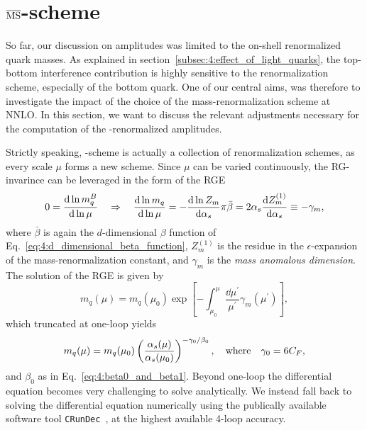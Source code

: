 \section{\texorpdfstring{$\overline{\mathrm{MS}}$}{MS}-scheme}
So far, our discussion on amplitudes was limited to the on-shell renormalized quark masses. As explained in section~\ref{subsec:4:effect_of_light_quarks}, the top-bottom interference contribution is highly sensitive to the renormalization scheme, especially of the bottom quark. One of our central aims, was therefore to investigate the impact of the choice of the mass-renormalization scheme at \acs{NNLO}. In this section, we want to discuss the relevant adjustments necessary for the computation of the \MS-renormalized amplitudes.

Strictly speaking, \MS-scheme is actually a collection of renormalization schemes, as every scale $\mu$ forms a new scheme. Since $\mu$ can be varied continuously, the \acs{RG}-invarince can be leveraged in the form of the \acs{RGE}
\begin{equation}
0 = \frac{\mathrm{d} \ln m_q^B}{\mathrm{d} \ln \mu} \quad \Rightarrow \quad \frac{\mathrm{d} \ln m_q}{\mathrm{d} \ln \mu} = - \frac{\mathrm{d} \ln Z_m}{\mathrm{d} \alpha_s} \pi \bar{\beta} = 2 \alpha_s \frac{\mathrm{d} Z_m^{(1)}}{\mathrm{d} \alpha_s} \equiv - \gamma_m,
\end{equation}
where $\bar{\beta}$ is again the $d$-dimensional $\beta$ function of Eq.~\eqref{eq:4:d_dimensional_beta_function}, $Z_m^{(1)}$ is the residue in the $\epsilon$-expansion of the mass-renormalization constant, and $\gamma_m$ is the \textit{mass anomalous dimension}. The solution of the \acs{RGE} is given by
\begin{equation}
m_q (\mu) = m_q(\mu_0) \exp\!\left[- \int_{\mu_0}^\mu \frac{\dd \mu^\prime}{\mu^\prime} \gamma_m(\mu^\prime) \right],
\end{equation}
which truncated at one-loop yields
\begin{equation}
m_q(\mu) = m_q(\mu_0) \left( \frac{\alpha_s(\mu)}{\alpha_s (\mu_0)} \right)^{- \gamma_0/\beta_0}, \quad \text{where} \quad \gamma_0 = 6 C_F,
\end{equation}
and $\beta_0$ as in Eq.~\eqref{eq:4:beta0_and_beta1}. Beyond one-loop the differential equation becomes very challenging to solve analytically. We instead fall back to solving the differential equation numerically using the publically available software tool \texttt{CRunDec}~\cite{Schmidt:2012az}, at the highest available 4-loop accuracy.
